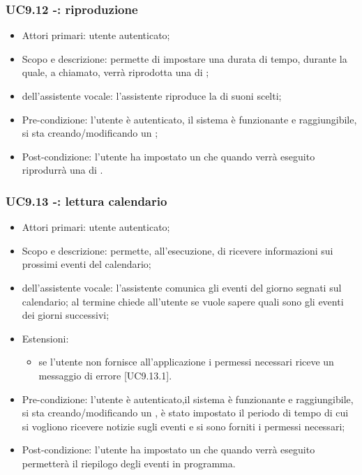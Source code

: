 \subsubsection{UC9.12 -: riproduzione }
\begin{itemize}
	\item  Attori primari: utente autenticato;
	\item  Scopo e descrizione: permette di impostare una durata di tempo, durante la quale, a  chiamato, verrà riprodotta una  di ;%
	\item  {} dell'assistente vocale: l'assistente riproduce la  di suoni scelti;
	\item  Pre-condizione: l'utente è autenticato, il sistema è funzionante e raggiungibile, si sta creando/modificando un ;
	\item  Post-condizione: l'utente ha impostato un  che quando verrà eseguito riprodurrà una  di .
\end{itemize}
\subsubsection{UC9.13 -: lettura calendario}
\begin{itemize}
	\item  Attori primari: utente autenticato;
	\item  Scopo e descrizione: permette, all'esecuzione, di ricevere informazioni sui prossimi eventi del calendario;
	\item  {} dell'assistente vocale: l'assistente comunica gli eventi del giorno segnati sul calendario; al termine chiede all'utente se vuole sapere quali sono gli eventi dei giorni successivi;
	\item  Estensioni: 
		   \begin{itemize}
				\item se l'utente non fornisce all'applicazione i permessi necessari riceve un messaggio di errore [UC9.13.1].
		   \end{itemize}
	\item  Pre-condizione: l'utente è autenticato,il sistema è funzionante e raggiungibile, si sta creando/modificando un , è stato impostato il periodo di tempo di cui si vogliono ricevere notizie sugli eventi e si sono forniti i permessi necessari;
	\item  Post-condizione: l'utente ha impostato un  che quando verrà eseguito permetterà il riepilogo degli eventi in programma.
\end{itemize}
